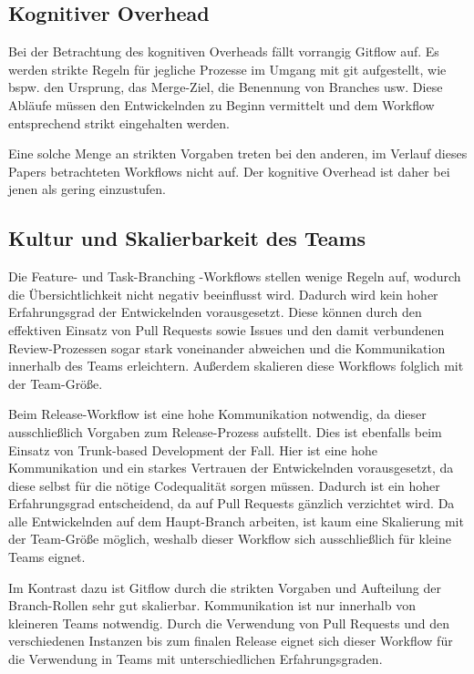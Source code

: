\subsection{Kognitiver Overhead}

Bei der Betrachtung des kognitiven Overheads fällt vorrangig Gitflow auf. Es werden strikte Regeln für jegliche Prozesse im Umgang mit git aufgestellt, wie bspw. den Ursprung, das Merge\hyp Ziel, die Benennung von Branches usw. Diese Abläufe müssen den Entwickelnden zu Beginn vermittelt und dem Workflow entsprechend strikt eingehalten werden.

Eine solche Menge an strikten Vorgaben treten bei den anderen, im Verlauf dieses Papers betrachteten Workflows nicht auf. Der kognitive Overhead ist daher bei jenen als gering einzustufen.


\subsection{Kultur und Skalierbarkeit des Teams}

Die Feature- und Task\hyp Branching \hyp Workflows stellen wenige Regeln auf, wodurch die Übersichtlichkeit nicht negativ beeinflusst wird. Dadurch wird kein hoher Erfahrungsgrad der Entwickelnden vorausgesetzt. Diese können durch den effektiven Einsatz von Pull Requests sowie Issues und den damit verbundenen Review\hyp Prozessen sogar stark voneinander abweichen und die Kommunikation innerhalb des Teams erleichtern. Außerdem skalieren diese Workflows folglich mit der Team\hyp Größe.

Beim Release\hyp Workflow ist eine hohe Kommunikation notwendig, da dieser ausschließlich Vorgaben zum Release\hyp Prozess aufstellt. Dies ist ebenfalls beim Einsatz von Trunk\hyp based Development der Fall. Hier ist eine hohe Kommunikation und ein starkes Vertrauen der Entwickelnden vorausgesetzt, da diese selbst für die nötige Codequalität sorgen müssen. Dadurch ist ein hoher Erfahrungsgrad entscheidend, da auf Pull Requests gänzlich verzichtet wird. Da alle Entwickelnden auf dem Haupt\hyp Branch arbeiten, ist kaum eine Skalierung mit der Team\hyp Größe möglich, weshalb dieser Workflow sich ausschließlich für kleine Teams eignet.

Im Kontrast dazu ist Gitflow durch die strikten Vorgaben und Aufteilung der Branch\hyp Rollen sehr gut skalierbar. Kommunikation ist nur innerhalb von kleineren Teams notwendig. Durch die Verwendung von Pull Requests und den verschiedenen Instanzen bis zum finalen Release eignet sich dieser Workflow für die Verwendung in Teams mit unterschiedlichen Erfahrungsgraden.

